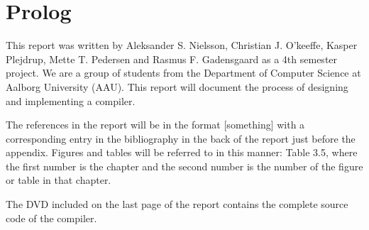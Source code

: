\section{Prolog}
This report was written by Aleksander S. Nielsson, Christian J. O'keeffe, Kasper Plejdrup, Mette T. Pedersen and Rasmus F. Gadensgaard as a 4th semester project. We are a group of students from the Department of Computer Science at Aalborg University (AAU). This report will document the process of designing and implementing a compiler.

The references in the report will be in the format [something] with a corresponding entry in the bibliography in the back of the report just before the appendix. Figures and tables will be referred to in this manner: Table 3.5, where the first number is the chapter and the second number is the number of the figure or table in that chapter.

The DVD included on the last page of the report contains the complete source code of the compiler.
